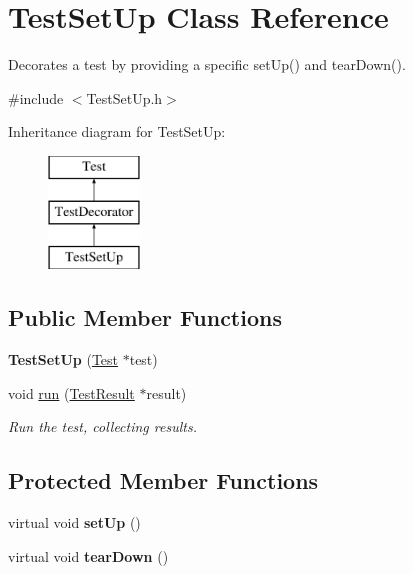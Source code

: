 \hypertarget{class_test_set_up}{}\section{Test\+Set\+Up Class Reference}
\label{class_test_set_up}


Decorates a test by providing a specific set\+Up() and tear\+Down().  




{\ttfamily \#include $<$Test\+Set\+Up.\+h$>$}

Inheritance diagram for Test\+Set\+Up\+:\begin{figure}[H]
\begin{center}
\leavevmode
\includegraphics[height=3.000000cm]{class_test_set_up}
\end{center}
\end{figure}
\subsection*{Public Member Functions}
\begin{DoxyCompactItemize}
\item 
{\bfseries Test\+Set\+Up} (\hyperlink{class_test}{Test} $\ast$test)\hypertarget{class_test_set_up_af89f6399e1c84dd43ac43253a6550c44}{}\label{class_test_set_up_af89f6399e1c84dd43ac43253a6550c44}

\item 
void \hyperlink{class_test_set_up_aa3f79125254c288d6effee6df8e7d5fb}{run} (\hyperlink{class_test_result}{Test\+Result} $\ast$result)\hypertarget{class_test_set_up_aa3f79125254c288d6effee6df8e7d5fb}{}\label{class_test_set_up_aa3f79125254c288d6effee6df8e7d5fb}

\begin{DoxyCompactList}\small\item\em Run the test, collecting results. \end{DoxyCompactList}\end{DoxyCompactItemize}
\subsection*{Protected Member Functions}
\begin{DoxyCompactItemize}
\item 
virtual void {\bfseries set\+Up} ()\hypertarget{class_test_set_up_a9b40e24a51084e66a53fce52b4c6314b}{}\label{class_test_set_up_a9b40e24a51084e66a53fce52b4c6314b}

\item 
virtual void {\bfseries tear\+Down} ()\hypertarget{class_test_set_up_aa935d1ec432a2d3f1be86c1172b1c028}{}\label{class_test_set_up_aa935d1ec432a2d3f1be86c1172b1c028}

\end{DoxyCompactItemize}
